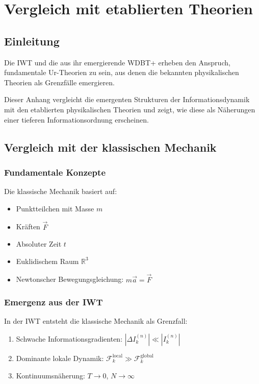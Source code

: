 \chapter{Vergleich mit etablierten Theorien}

\section{Einleitung}

Die IWT und die aus ihr emergierende WDBT+ erheben den Anspruch, fundamentale Ur-Theorien zu sein, aus denen die bekannten physikalischen Theorien als Grenzfälle emergieren.

Dieser Anhang vergleicht die emergenten Strukturen der Informationsdynamik mit den etablierten physikalischen Theorien und zeigt, wie diese als Näherungen einer tieferen Informationsordnung erscheinen.

\section{Vergleich mit der klassischen Mechanik}

\subsection{Fundamentale Konzepte}

Die klassische Mechanik basiert auf:
\begin{itemize}
\item Punktteilchen mit Masse \( m \)
\item Kräften \( \vec{F} \)
\item Absoluter Zeit \( t \)
\item Euklidischem Raum \( \mathbb{R}^3 \)
\item Newtonscher Bewegungsgleichung: \( m\vec{a} = \vec{F} \)
\end{itemize}

\subsection{Emergenz aus der IWT}

In der IWT entsteht die klassische Mechanik als Grenzfall:
\begin{enumerate}
\item Schwache Informationsgradienten: \( |\Delta I_k^{(n)}| \ll |I_k^{(n)}| \)
\item Dominante lokale Dynamik: \( \mathcal{F}_k^{\text{local}} \gg \mathcal{F}_k^{\text{global}} \)
\item Kontinuumsnäherung: \( T \to 0 \), \( N \to \infty \)
\end{enumerate}

